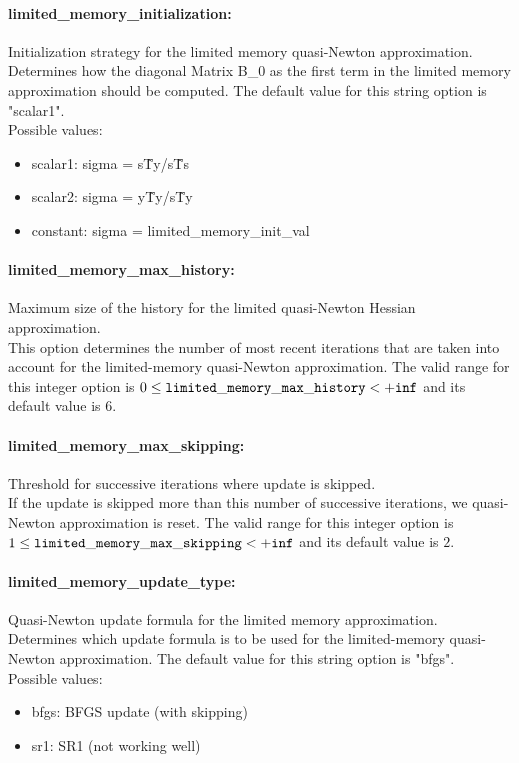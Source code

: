 \paragraph{limited\_memory\_initialization:}\label{sec:limited_memory_initialization} Initialization strategy for the limited memory quasi-Newton approximation. $\;$ \\
 Determines how the diagonal Matrix B\_0 as the
first term in the limited memory approximation
should be computed.
The default value for this string option is "scalar1".
\\ 
Possible values:
\begin{itemize}
   \item scalar1: sigma = s\^Ty/s\^Ts
   \item scalar2: sigma = y\^Ty/s\^Ty
   \item constant: sigma = limited\_memory\_init\_val
\end{itemize}

\paragraph{limited\_memory\_max\_history:}\label{sec:limited_memory_max_history} Maximum size of the history for the limited quasi-Newton Hessian approximation. $\;$ \\
 This option determines the number of most recent
iterations that are taken into account for the
limited-memory quasi-Newton approximation. The valid range for this integer option is
$0 \le {\tt limited\_memory\_max\_history } <  {\tt +inf}$
and its default value is $6$.


\paragraph{limited\_memory\_max\_skipping:}\label{sec:limited_memory_max_skipping} Threshold for successive iterations where update is skipped. $\;$ \\
 If the update is skipped more than this number of
successive iterations, we quasi-Newton
approximation is reset. The valid range for this integer option is
$1 \le {\tt limited\_memory\_max\_skipping } <  {\tt +inf}$
and its default value is $2$.


\paragraph{limited\_memory\_update\_type:}\label{sec:limited_memory_update_type} Quasi-Newton update formula for the limited memory approximation. $\;$ \\
 Determines which update formula is to be used for
the limited-memory quasi-Newton approximation.
The default value for this string option is "bfgs".
\\ 
Possible values:
\begin{itemize}
   \item bfgs: BFGS update (with skipping)
   \item sr1: SR1 (not working well)
\end{itemize}

